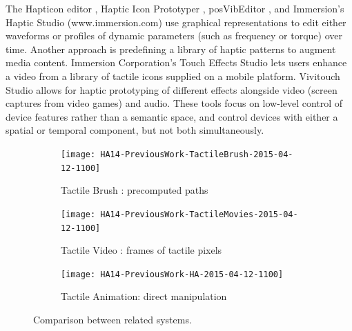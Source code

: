 The Hapticon editor \cite{Enriquez2003}, Haptic Icon Prototyper \cite{Swindells2006}, posVibEditor \cite{Ryu2008}, and Immersion's Haptic Studio (www.immersion.com) use graphical representations to edit either waveforms or profiles of dynamic parameters (such as frequency or torque) over time.
Another %
approach is predefining a library of haptic patterns to augment media content. %
Immersion Corporation's Touch Effects Studio lets users enhance a video from a  library of tactile icons supplied on a mobile platform.
Vivitouch Studio \cite{Swindells2014} allows for haptic prototyping of different effects alongside video (screen captures from video games) and audio. 
These tools focus on low-level control of device features rather than a semantic space, and control devices with either a spatial or temporal component, but not both simultaneously. 




\newcommand\prevWorkWidth{1.25in}
\newcommand\prevWorkImageWidth{1.1in}


\begin{figure}[t]
 \centering
   \begin{subfigure}[t]{\prevWorkWidth}
	  \centering
	   \texttt{[image: HA14-PreviousWork-TactileBrush-2015-04-12-1100]} 
	   \caption{Tactile Brush \cite{Israr2011a}: precomputed paths}
	   \label{fig:prevwork:tactilebrush}
    \end{subfigure}
    \qquad
  \begin{subfigure}[t]{\prevWorkWidth}
  	\centering
	   \texttt{[image: HA14-PreviousWork-TactileMovies-2015-04-12-1100]} 
	   \caption{Tactile Video \cite{Kim2009}: frames of tactile pixels}
	   \label{fig:prevwork:tactilemovies}
    \end{subfigure}
	\qquad
      \begin{subfigure}[t]{\prevWorkWidth}
	      \centering
	   \texttt{[image: HA14-PreviousWork-HA-2015-04-12-1100]} 
	   \caption{Tactile Animation: direct manipulation}
	   \label{fig:prevwork:ha}
    \end{subfigure}
    \caption{Comparison between related systems.}
    \label{fig:tactileanimation:prevwork}
\end{figure}




